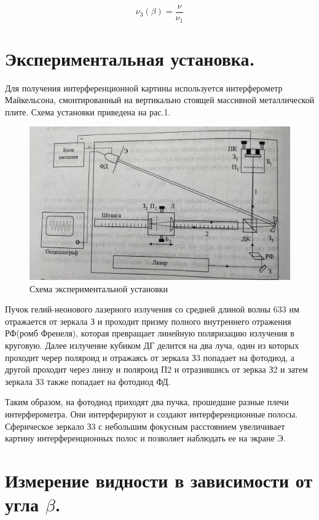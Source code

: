 \documentclass[a4paper,12pt]{article}
\begin{document}
\[ \nu_3(\beta ) = \frac{\nu }{\nu_1} \]
 
  
\section{Экспериментальная установка.} 

  Для получения интерференционной картины используется интерферометр Майкельсона, смонтированный на вертикально стоящей массивной металлической плите. Схема установки приведена на рас.1.
  
    
  \begin{figure}[H]
  \begin{center}
    \includegraphics[width=15cm]{ex1.jpg}
    \caption{Схема экспериментальной установки}
    \label{fig:}
  \end{center}
\end{figure}

  Пучок гелий-неонового лазерного излучения со средней длиной волны 633 нм отражается от зеркала З и проходит призму полного внутреннего отражения РФ(ромб Френеля), которая превращает линейную поляризацию излучения в круговую. Далее излучение кубиком ДГ делится на два луча, один из которых проходит черер поляроид и отражаясь от зеркала З3 попадает на фотодиод, а другой проходит через линзу и поляроид П2 и отразившись от зеркаа З2 и затем зеркала З3 также попадает на фотодиод ФД. 
  
  Таким образом, на фотодиод приходят два пучка, прошедшие разные плечи интерферометра. Они интерферируют и создают интерференционные полосы. Сферическое зеркало З3 с небольшим фокусным расстоянием увеличивает картину интерференционных полос и позволяет наблюдать ее на экране Э.
  
  


\section{Измерение видности в зависимости от угла $\beta  $.} 
\end{document}
